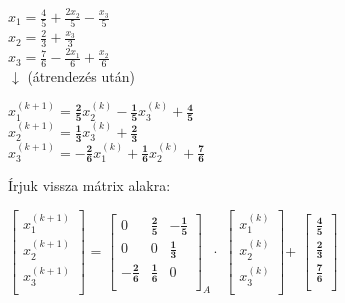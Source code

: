 \documentclass[tikz,12pt,margin=0px]{article}
\newcommand\ddfrac[2]{\frac{\displaystyle #1}{\displaystyle #2}}
\begin{document}
    \begin{center}
            $x_1 = \ddfrac{4}{5} + \ddfrac{2x_2}{5} - \ddfrac{x_3}{5}$ \\
            $x_2 = \ddfrac{2}{3} + \ddfrac{x_3}{3} $ \\
            $x_3 = \ddfrac{7}{6} - \ddfrac{2x_1}{6} + \ddfrac{x_2}{6}$ \\
            $\downarrow$ {\tiny (átrendezés után)}
    \end{center}

    \begin{center}
            $x_1^{(k+1)} = \ddfrac{\textbf{2}}{\textbf{5}} x_2^{(k)} - \ddfrac{\textbf{1}}{\textbf{5}}x_3^{(k)} + \ddfrac{\textbf{4}}{\textbf{5}} $ \\
            $x_2^{(k+1)} = \ddfrac{\textbf{1}}{\textbf{3}}x_3^{(k)} + \ddfrac{\textbf{2}}{\textbf{3}}$ \\
            $x_3^{(k+1)} = - \ddfrac{\textbf{2}}{\textbf{6}}x_1^{(k)} + \ddfrac{\textbf{1}}{\textbf{6}}x_2^{(k)} + \ddfrac{\textbf{7}}{\textbf{6}}$ \\
    \end{center}

    \noindent Írjuk vissza mátrix alakra:

    \begin{center}
        $\begin{bmatrix}
            x_1^{(k+1)} \\[0.3em]
            x_2^{(k+1)} \\[0.3em]
            x_3^{(k+1)} \\[0.3em]
        \end{bmatrix}$ =
        $\begin{bmatrix}
            0 & \ddfrac{\textbf{2}}{\textbf{5}} & -\ddfrac{\textbf{1}}{\textbf{5}} \\[0.3em]
            0 & 0 & \ddfrac{\textbf{1}}{\textbf{3}} \\[0.3em]
            -\ddfrac{\textbf{2}}{\textbf{6}} & \ddfrac{\textbf{1}}{\textbf{6}} & 0 \\[0.3em]
        \end{bmatrix}_{A} \cdot$
        $\begin{bmatrix}
            x_1^{(k)} \\[0.3em]
            x_2^{(k)} \\[0.3em]
            x_3^{(k)} \\[0.3em]
        \end{bmatrix}$+
        $\begin{bmatrix}
            \ddfrac{\textbf{4}}{\textbf{5}} \\[0.3em]
            \ddfrac{\textbf{2}}{\textbf{3}} \\[0.3em]
            \ddfrac{\textbf{7}}{\textbf{6}} \\[0.3em]
        \end{bmatrix}$
    \end{center}
\end{document}
